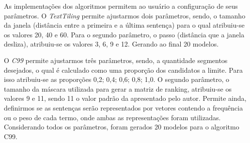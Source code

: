 As implementações dos algoritmos permitem ao usuário a configuração de seus parâmetros. 
%
O \textit{TextTiling} permite ajustarmos dois parâmetros, sendo, o tamanho da janela (distância entre a primeira e a última sentença) para o qual atribuiu-se os valores 20, 40 e 60. Para o segundo parâmetro, o passo (distância que a janela desliza), atribuiu-se os valores 3, 6, 9 e 12. Gerando ao final 20 modelos.
%

O \textit{C99} permite ajustarmos três parâmetros, sendo, a quantidade segmentos desejados, o qual é calculado como uma proporção dos candidatos a limite. Para isso atribuiu-se as proporções {0,2; 0,4; 0,6; 0,8; 1,0}. O segundo parâmetro, o tamanho da máscara utilizada para gerar a matriz de ranking, atribuiu-se os valores 9 e 11, sendo 11 o valor padrão da apresentado pelo autor. Permite ainda, definirmos se as sentenças serão representados por vetores contendo a frequência ou o peso de cada termo, onde ambas as representações foram utilizadas.
%
 Considerando todos os parâmetros, foram gerados 20 modelos para o algoritmo C99.%
















%




%	

%
%

	 






